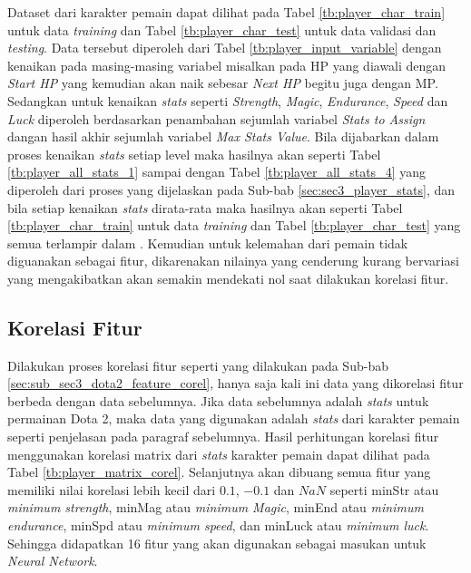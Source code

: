 Dataset dari karakter pemain dapat dilihat pada Tabel \ref{tb:player_char_train} untuk data \textit{training} dan Tabel \ref{tb:player_char_test} untuk data validasi dan \textit{testing}. Data tersebut diperoleh dari Tabel \ref{tb:player_input_variable} dengan kenaikan pada masing-masing variabel misalkan pada HP yang diawali dengan \textit{Start HP} yang kemudian akan naik sebesar \textit{Next HP} begitu juga dengan MP. Sedangkan untuk kenaikan \textit{stats} seperti \textit{Strength}, \textit{Magic}, \textit{Endurance}, \textit{Speed} dan \textit{Luck} diperoleh berdasarkan penambahan sejumlah variabel \textit{Stats to Assign} dangan hasil akhir sejumlah variabel \textit{Max Stats Value}. Bila dijabarkan dalam proses kenaikan \textit{stats} setiap level maka hasilnya akan seperti Tabel \ref{tb:player_all_stats_1} sampai dengan Tabel \ref{tb:player_all_stats_4} yang diperoleh dari proses yang dijelaskan pada Sub-bab \ref{sec:sec3_player_stats}, dan bila setiap kenaikan \textit{stats} dirata-rata maka hasilnya akan seperti Tabel \ref{tb:player_char_train} untuk data \textit{training} dan Tabel \ref{tb:player_char_test} yang semua terlampir dalam . Kemudian untuk kelemahan dari pemain tidak diguanakan sebagai fitur, dikarenakan nilainya yang cenderung kurang bervariasi yang mengakibatkan akan semakin mendekati nol saat dilakukan korelasi fitur.
\vspace{1ex}

\subsection{Korelasi Fitur}
\label{sec:sub_sec3_player_feature_corel}
\vspace{1ex}

Dilakukan proses korelasi fitur seperti yang dilakukan pada Sub-bab \ref{sec:sub_sec3_dota2_feature_corel}, hanya saja kali ini data yang dikorelasi fitur berbeda dengan data sebelumnya. Jika data sebelumnya adalah \textit{stats} untuk permainan Dota 2, maka data yang digunakan adalah \textit{stats} dari karakter pemain seperti penjelasan pada paragraf sebelumnya. Hasil perhitungan korelasi fitur menggunakan korelasi matrix dari \textit{stats} karakter pemain dapat dilihat pada Tabel \ref{tb:player_matrix_corel}. Selanjutnya akan dibuang semua fitur yang memiliki nilai korelasi lebih kecil dari $0.1$, $-0.1$ dan $NaN$ seperti minStr atau \textit{minimum strength}, minMag atau \textit{minimum Magic}, minEnd atau \textit{minimum endurance}, minSpd atau \textit{minimum speed}, dan minLuck atau \textit{minimum luck}. Sehingga didapatkan 16 fitur yang akan digunakan sebagai masukan untuk \textit{Neural Network}.
\vspace{-1ex}

